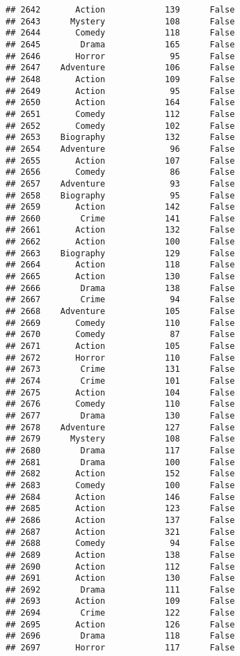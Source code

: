 \documentclass[
]{article}
\begin{document}
\begin{verbatim}
## 2642       Action            139      False
## 2643      Mystery            108      False
## 2644       Comedy            118      False
## 2645        Drama            165      False
## 2646       Horror             95      False
## 2647    Adventure            106      False
## 2648       Action            109      False
## 2649       Action             95      False
## 2650       Action            164      False
## 2651       Comedy            112      False
## 2652       Comedy            102      False
## 2653    Biography            132      False
## 2654    Adventure             96      False
## 2655       Action            107      False
## 2656       Comedy             86      False
## 2657    Adventure             93      False
## 2658    Biography             95      False
## 2659       Action            142      False
## 2660        Crime            141      False
## 2661       Action            132      False
## 2662       Action            100      False
## 2663    Biography            129      False
## 2664       Action            118      False
## 2665       Action            130      False
## 2666        Drama            138      False
## 2667        Crime             94      False
## 2668    Adventure            105      False
## 2669       Comedy            110      False
## 2670       Comedy             87      False
## 2671       Action            105      False
## 2672       Horror            110      False
## 2673        Crime            131      False
## 2674        Crime            101      False
## 2675       Action            104      False
## 2676       Comedy            110      False
## 2677        Drama            130      False
## 2678    Adventure            127      False
## 2679      Mystery            108      False
## 2680        Drama            117      False
## 2681        Drama            100      False
## 2682       Action            152      False
## 2683       Comedy            100      False
## 2684       Action            146      False
## 2685       Action            123      False
## 2686       Action            137      False
## 2687       Action            321      False
## 2688       Comedy             94      False
## 2689       Action            138      False
## 2690       Action            112      False
## 2691       Action            130      False
## 2692        Drama            111      False
## 2693       Action            109      False
## 2694        Crime            122      False
## 2695       Action            126      False
## 2696        Drama            118      False
## 2697       Horror            117      False

\end{verbatim}
\end{document}

